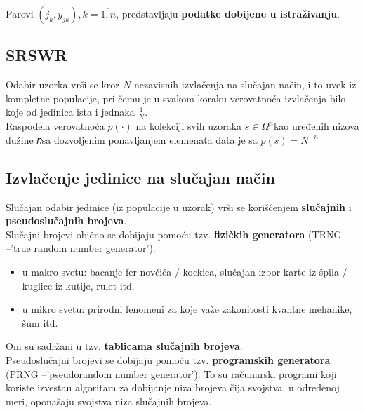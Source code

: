\documentclass[10pt,a4paper,]{article}
\begin{document}
Parovi $(j_k,y_{jk}), k=\overline{1,𝑛}$, predstavljaju 
\textbf{podatke dobijene u 
istraživanju}.

\subsection{SRSWR}
\textbullet	Odabir uzorka vrši se kroz $N$ nezavisnih izvlačenja na 
slučajan način, i to uvek iz kompletne populacije, pri čemu je u 
svakom koraku verovatnoća izvlačenja bilo koje od jedinica ista i 
jednaka $\frac{1}{N}$.
\\
\textbullet 
Raspodela verovatnoća $p(\cdot)$ na kolekciji svih uzoraka
$s \in \Omega^n$kao 
uređenih 
nizova dužine 𝑛sa dozvoljenim ponavljanjem elemenata data je sa
$p(s) = N^{-n}$

\subsection{Izvlačenje jedinice na slučajan način}
Slučajan odabir jedinice (iz populacije u uzorak) vrši se korišćenjem 
\textbf{slučajnih} i \textbf{pseudoslučajnih brojeva}.
\\
Slučajni brojevi obično se dobijaju pomoću tzv. 
\textbf{fizičkih
generatora}
(TRNG –'true random number generator').
\begin{itemize}
\item u makro svetu: bacanje fer novčića / 
kockica, slučajan izbor karte iz špila / kuglice 
iz kutije, rulet itd.
\item u mikro svetu: prirodni fenomeni za koje važe zakonitosti kvantne mehanike, šum itd.
\end{itemize}
Oni su sadržani u tzv. \textbf{tablicama slučajnih brojeva}.
\\[0.1cm]
Pseudoslučajni brojevi se dobijaju pomoću tzv. \textbf{programskih generatora}
(PRNG –'pseudorandom number generator').
To su računarski programi koji koriste izvestan algoritam za dobijanje niza brojeva čija 
svojstva, u određenoj meri, oponašaju svojstva niza slučajnih brojeva.
\end{document}
